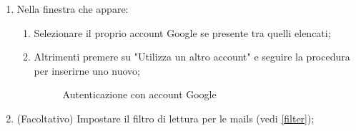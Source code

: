 \begin{enumerate}
	\newpage
	\item Nella finestra che appare:
	\begin{enumerate}
		\item Selezionare il proprio account Google se presente tra quelli elencati;
		\item Altrimenti premere su "Utilizza un altro account" e seguire la procedura per inserirne uno nuovo;
		\begin{figure}[!ht]
			\centering
			\caption{Autenticazione con account Google}
		\end{figure}
	\end{enumerate}
	\item (Facoltativo) Impostare il filtro di lettura per le mails (vedi \ref{filter});

\end{enumerate}
